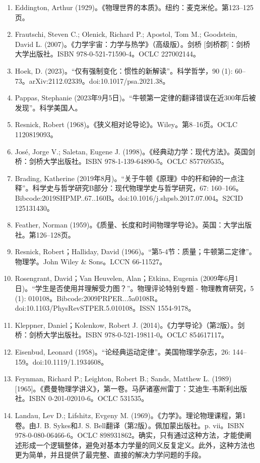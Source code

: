 \begin{enumerate}
\item Eddington, Arthur (1929)。《物理世界的本质》。纽约：麦克米伦。第123–125页。
\item Frautschi, Steven C.; Olenick, Richard P.; Apostol, Tom M.; Goodstein, David L. (2007)。《力学宇宙：力学与热学》（高级版）。剑桥 [剑桥郡]：剑桥大学出版社。ISBN 978-0-521-71590-4。OCLC 227002144。
\item Hoek, D. (2023)。“仅有强制变化：惯性的新解读”。科学哲学，90 (1): 60–73。arXiv:2112.02339。doi:10.1017/psa.2021.38。
\item Pappas, Stephanie (2023年9月5日)。“牛顿第一定律的翻译错误在近300年后被发现”。科学美国人。
\item Resnick, Robert (1968)。《狭义相对论导论》。Wiley。第8–16页。OCLC 1120819093。
\item José, Jorge V.; Saletan, Eugene J. (1998)。《经典动力学：现代方法》。英国剑桥：剑桥大学出版社。ISBN 978-1-139-64890-5。OCLC 857769535。
\item Brading, Katherine (2019年8月)。“关于牛顿《原理》中的杆和钟的一点注释”。科学史与哲学研究B部分：现代物理学史与哲学研究，67: 160–166。Bibcode:2019SHPMP..67..160B。doi:10.1016/j.shpsb.2017.07.004。S2CID 125131430。
\item Feather, Norman (1959)。《质量、长度和时间物理学导论》。英国：大学出版社。第126–128页。
\item Resnick, Robert；Halliday, David (1966)。“第5-4节：质量；牛顿第二定律”。物理学。John Wiley & Sons。LCCN 66-11527。
\item Rosengrant, David；Van Heuvelen, Alan；Etkina, Eugenia (2009年6月1日)。“学生是否使用并理解受力图？”。物理评论特别专题 - 物理教育研究，5 (1): 010108。Bibcode:2009PRPER...5a0108R。doi:10.1103/PhysRevSTPER.5.010108。ISSN 1554-9178。
\item Kleppner, Daniel；Kolenkow, Robert J. (2014)。《力学导论》（第2版）。剑桥：剑桥大学出版社。ISBN 978-0-521-19811-0。OCLC 854617117。
\item Eisenbud, Leonard (1958)。“论经典运动定律”。美国物理学杂志，26: 144–159。doi:10.1119/1.1934608。
\item Feynman, Richard P.; Leighton, Robert B.; Sands, Matthew L. (1989) [1965]。《费曼物理学讲义》，第一卷。马萨诸塞州雷丁：艾迪生-韦斯利出版社。ISBN 0-201-02010-6。OCLC 531535。
\item Landau, Lev D.; Lifshitz, Evgeny M. (1969)。《力学》。理论物理课程，第1卷。由J. B. Sykes和J. S. Bell翻译（第2版）。佩加蒙出版社。p. vii。ISBN 978-0-080-06466-6。OCLC 898931862。确实，只有通过这种方法，才能使阐述形成一个逻辑整体，避免对基本力学量的同义反复定义。此外，这种方法也更为简单，并且提供了最完整、直接的解决力学问题的手段。

\end{enumerate}
